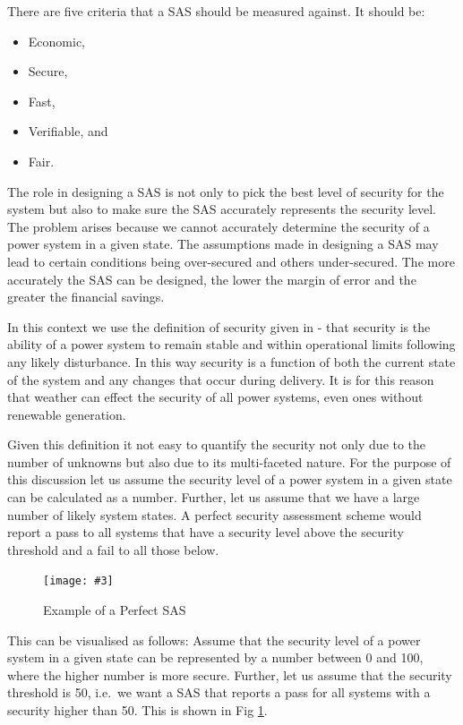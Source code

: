 \documentclass[a4paper,oneside,12pt]{report}
\newcommand{\image}[3] {
  \begin{figure}
    \begin{center}
      \texttt{[image: \#3]}
      \caption{#2}
      \label{#1}
    \end{center}
  \end{figure}
}
\begin{document}
There are five criteria that a SAS should be measured against. It should be:

\begin{itemize}
  \item Economic,
  \item Secure,
  \item Fast,
  \item Verifiable, and
  \item Fair.
\end{itemize}

The role in designing a SAS is not only to pick the best level of security for the system but also to make sure the SAS accurately represents the security level. The problem arises because we cannot accurately determine the security of a power system in a given state. The assumptions made in designing a SAS may lead to certain conditions being over-secured and others under-secured. The more accurately the SAS can be designed, the lower the margin of error and the greater the financial savings.

In this context we use the definition of security given in \cite{Kundur2004} - that security is the ability of a power system to remain stable and within operational limits following any likely disturbance. In this way security is a function of both the current state of the system and any changes that occur during delivery. It is for this reason that weather can effect the security of all power systems, even ones without renewable generation.

Given this definition it not easy to quantify the security not only due to the number of unknowns but also due to its multi-faceted nature. For the purpose of this discussion let us assume the security level of a power system in a given state can be calculated as a number. Further, let us assume that we have a large number of likely system states. A perfect security assessment scheme would report a pass to all systems that have a security level above the security threshold and a fail to all those below.

\image{perfectSAS}{Example of a Perfect SAS}{perfectsas.png}

This can be visualised as follows: Assume that the security level of a power system in a given state can be represented by a number between 0 and 100, where the higher number is more secure. Further, let us assume that the security threshold is 50, i.e.\ we want a SAS that reports a pass for all systems with a security higher than 50. This is shown in Fig \ref{perfectSAS}.
\end{document}

